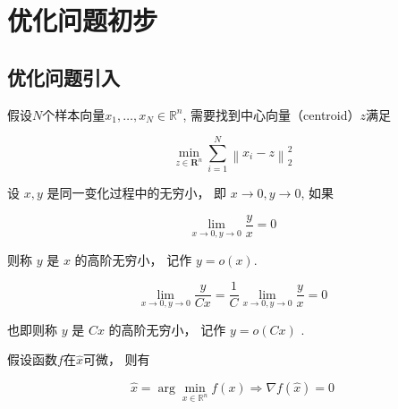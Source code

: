 \chapter{优化问题初步}
    
\section{优化问题引入}

\begin{problem}
    \label{Problem:ClusteringCenter}
    假设$N$个样本向量$ x_{1}, \ldots, x_{N} \in \mathbb{R}^{n} $, 需要找到中心向量（centroid）$z$满足

    \begin{equation} \min _{z \in \mathbf{R}^{n}} \sum_{i=1}^{N}\left\|x_{i}-z\right\|_{2}^{2} \end{equation}
\end{problem}

\begin{definition}[高阶无穷小(记号 $o$)]
    设 $ x, y $ 是同一变化过程中的无穷小， 即 $ x \rightarrow 0, y \rightarrow 0 $, 如果

\begin{equation}
\lim_{x \rightarrow 0, y \rightarrow 0} \frac{y}{x}=0
\end{equation}

则称 $ y $ 是 $ x $ 的高阶无穷小， 记作 $ y=o(x) $.
\end{definition}

\begin{corollary}
    \begin{equation} \lim_{x \rightarrow 0, y \rightarrow 0} \frac{y}{C x}=\frac{1}{C} \lim_{x \rightarrow 0, y \rightarrow 0} \frac{y}{x}=0 \end{equation}

    也即则称 $ y $ 是 $ C x $ 的高阶无穷小， 记作 $ y=o(C x) $ . 
\end{corollary}

\begin{theorem}[凸优化求解的必要条件]
    假设函数$f$在$\hat{x}$可微， 则有

    \begin{equation} \hat{x}=\arg \min _{x \in \mathbb{R}^{n}} f(x) \Rightarrow \nabla f(\hat{x})=0 \end{equation}
\end{theorem}


